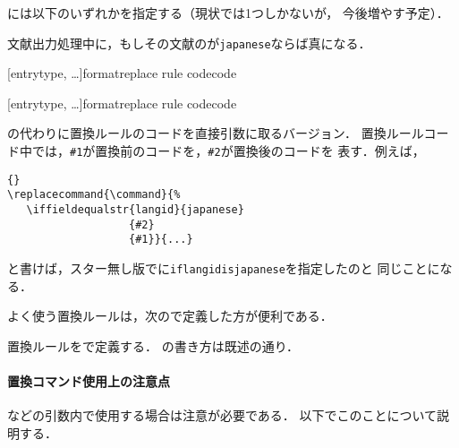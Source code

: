 \documentclass[lualatex,ja=standard,magstyle=real]{bxjsarticle}
\begin{document}
には以下のいずれかを指定する（現状では1つしかないが，
  今後増やす予定）．
\begin{typelist}
  文献出力処理中に，もしその文献のが\texttt{japanese}ならば真になる．
\end{typelist}

\begin{ltxsyntax}


  [entrytype, \dots]{format}{replace rule code}{code}

  [entrytype, \dots]{format}{replace rule code}{code}

  の代わりに置換ルールのコードを直接引数に取るバージョン．
  置換ルールコード中では，\verb|#1|が置換前のコードを，\verb|#2|が置換後のコードを
  表す．例えば，
\begin{lstlisting}[style=latex]{}
\replacecommand{\command}{%
   \iffieldequalstr{langid}{japanese}
                   {#2}
                   {#1}}{...}
\end{lstlisting}
  と書けば，スター無し版でに\texttt{iflangidisjapanese}を指定したのと
  同じことになる．

  よく使う置換ルールは，次ので定義した方が便利である．



  置換ルールをで定義する．
  の書き方は既述の通り．
\end{ltxsyntax}

\paragraph{置換コマンド使用上の注意点}
などの引数内で使用する場合は注意が必要である．
以下でこのことについて説明する．
\end{document}
